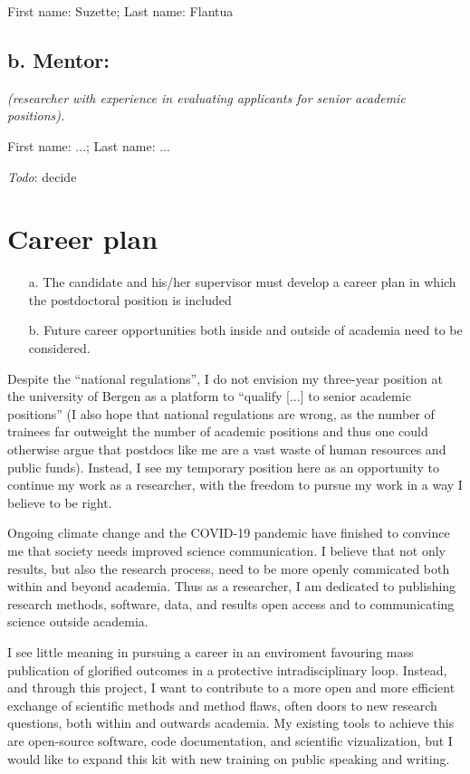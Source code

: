 \documentclass{article}
\renewcommand{\cvdoubleitem}[4]{#1: #2; #3: #4}
\newcommand{\names}[2]{\cvdoubleitem{First name}{#1}{Last name}{#2}}
\newcommand{\guideline}[1]{{\color{color2}\itshape{#1}}}
\newcommand{\todo}[1]{{\color{red}\emph{Todo}: #1}}
\begin{document}
    \names{Suzette}{Flantua}

\subsection{b. Mentor:}

    \guideline{
        (researcher with experience in evaluating applicants for senior
        academic positions).}

    \names{...}{...}

    \todo{decide}


\section{Career plan}

    \guideline{
        \begin{itemize}
          \item[a.] The candidate and his/her supervisor must develop a career
            plan in which the postdoctoral position is included
          \item[b.] Future career opportunities both inside and outside of
            academia need to be considered.
        \end{itemize}}

    Despite the ``national regulations'', I do not envision my three-year
    position at the university of Bergen as a platform to ``qualify [...] to
    senior academic positions'' (I also hope that national regulations are
    wrong, as the number of trainees far outweight the number of academic
    positions and thus one could otherwise argue that postdocs like me are a
    vast waste of human resources and public funds). Instead, I see my
    temporary position here as an opportunity to
    continue my work as a researcher, with the freedom to pursue my work in a
    way I believe to be right.

    Ongoing climate change and the COVID-19 pandemic have finished to convince
    me that society needs improved science communication. I believe that not
    only results, but also the research process, need to be more openly
    commicated both within and beyond academia. Thus as a researcher, I am
    dedicated to publishing research methods, software, data, and
    results open access and to communicating science outside academia.

    I see little meaning in pursuing a career in an enviroment favouring mass
    publication of glorified outcomes in a protective intradisciplinary loop.
    Instead, and through this project, I want to contribute to a more open and
    more efficient exchange of scientific methods and method flaws, often doors
    to new research questions, both within and outwards academia. My existing
    tools to achieve this are open-source software, code documentation, and
    scientific vizualization, but I would like to expand this kit with new
    training on public speaking and writing.
\end{document}
